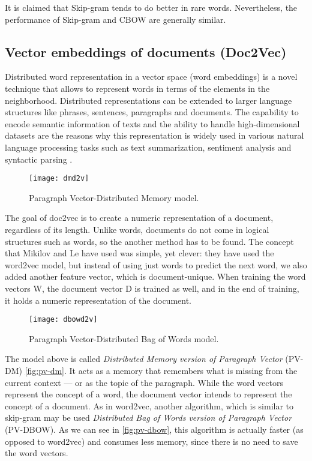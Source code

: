It is claimed that Skip-gram tends to do better in rare words. Nevertheless, the performance of Skip-gram and CBOW are generally similar.

\subsection{Vector embeddings of documents (Doc2Vec)}

Distributed word representation in a vector space (word embeddings) is a novel technique that allows to represent words in terms of the elements in the neighborhood.
Distributed representations can be extended to larger language structures like phrases, sentences, paragraphs and documents. The capability to encode semantic information of texts and the ability to handle high-dimensional datasets are the reasons why this representation is widely used in various natural language processing tasks such as text summarization, sentiment analysis and syntactic parsing \cite{le2014distributed}.

\begin{figure}[ht]
	\centering
	\texttt{[image: dmd2v]}
	\caption[Paragraph vector distributed memory model example]{Paragraph Vector-Distributed Memory model.}
	\label{fig:pv-dm}
\end{figure}

The goal of doc2vec is to create a numeric representation of a document, regardless of its length.
Unlike words, documents do not come in logical structures such as words, so the another method has to be found.
The concept that Mikilov and Le \cite{le2014distributed} have used was simple, yet clever: they have used the word2vec model, but instead of using just words to predict the next word, we also added another feature vector, which is document-unique.
When training the word vectors W, the document vector D is trained as well, and in the end of training, it holds a numeric representation of the document.

\begin{figure}[ht]
	\centering
	\texttt{[image: dbowd2v]}
	\caption[Paragraph vector distributed bag of words model example]{Paragraph Vector-Distributed Bag of Words model.}
	\label{fig:pv-dbow}
\end{figure}

The model above is called \textit{Distributed Memory version of Paragraph Vector} (PV-DM) \autoref{fig:pv-dm}. It acts as a memory that remembers what is missing from the current context — or as the topic of the paragraph. While the word vectors represent the concept of a word, the document vector intends to represent the concept of a document.
As in word2vec, another algorithm, which is similar to skip-gram may be used \textit{Distributed Bag of Words version of Paragraph Vector} (PV-DBOW).
As we can see in \autoref{fig:pv-dbow}, this algorithm is actually faster (as opposed to word2vec) and consumes less memory, since there is no need to save the word vectors.